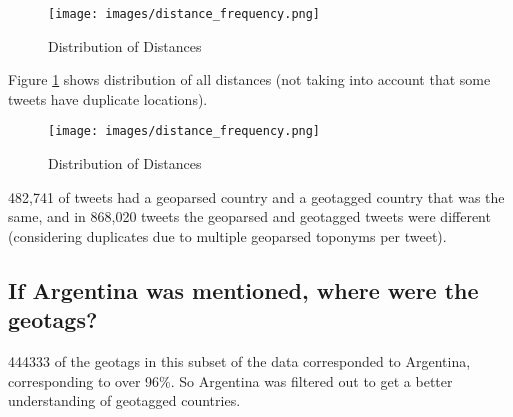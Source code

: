\begin{figure}[H]
    \centering
    \texttt{[image: images/distance\_frequency.png]}
    
    \caption{Distribution of Distances}
    \label{fig:distribution-distances}
\end{figure}

Figure \ref{fig:distribution-distances} shows distribution of all distances (not taking into account that some tweets have duplicate locations).

\begin{figure}[H]
    \centering
    \texttt{[image: images/distance\_frequency.png]}
    
    \caption{Distribution of Distances}
    \label{fig:distance-frequency}
\end{figure}

482,741 of tweets had a geoparsed country and a geotagged country that was the same, and in 868,020 tweets the geoparsed and geotagged tweets were different (considering duplicates due to multiple geoparsed toponyms per tweet).

\subsection{If Argentina was mentioned, where were the geotags?}

444333 of the geotags in this subset of the data corresponded to Argentina, corresponding to over 96\%. So Argentina was filtered out to get a better understanding of geotagged countries.


